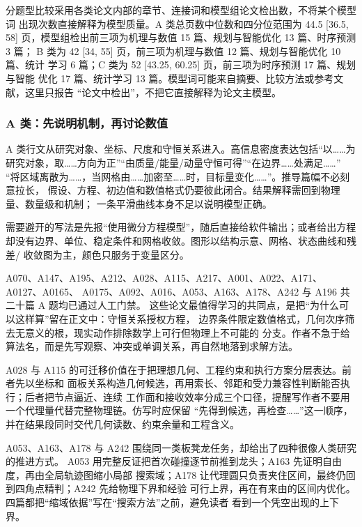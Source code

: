 \documentclass[UTF8,a4paper,12pt]{ctexart}
\begin{document}
分题型比较采用各类论文内部的章节、连接词和模型组论文检出数，不将某个模型词
出现次数直接解释为模型质量。A 类总页数中位数和四分位范围为 44.5 [36.5, 58]
页，模型组检出前三项为机理与数值 15 篇、规划与智能优化 13 篇、时序预测 3 篇；
B 类为 42 [34, 55] 页，前三项为机理与数值 12 篇、规划与智能优化 10 篇、统计
学习 6 篇；C 类为 52 [43.25, 60.25] 页，前三项为时序预测 17 篇、规划与智能
优化 17 篇、统计学习 13 篇。模型词可能来自摘要、比较方法或参考文献，这里只报告
“论文中检出”，不把它直接解释为论文主模型。

\subsubsection{A 类：先说明机制，再讨论数值}

A 类行文从研究对象、坐标、尺度和守恒关系进入。高信息密度表达包括“以……为
研究对象，取……方向为正”“由质量/能量/动量守恒可得”“在边界……处满足……”
“将区域离散为……，当网格由……加密至……时，目标量变化……”。推导篇幅不必刻意拉长，
假设、方程、初边值和数值格式仍要彼此闭合。结果解释需回到物理量、数量级和机制；
一条平滑曲线本身不足以说明模型正确。

需要避开的写法是先报“使用微分方程模型”，随后直接给软件输出；或者给出方程
却没有边界、单位、稳定条件和网格收敛。图形以结构示意、网格、状态曲线和残差/
收敛图为主，颜色只服务于变量区分。

A070、A147、A195、A212、A028、A115、A217、A001、A022、A171、A0127、A0165、
A0175、A092、A016、A053、A163、A178、A242 与 A196 共二十篇 A 题均已通过人工门禁。
这些论文最值得学习的共同点，是把“为什么可以这样算”留在正文中：守恒关系授权方程，
边界条件限定数值格式，几何次序筛去无意义的根，现实动作排除数学上可行但物理上不可能的
分支。作者不急于给算法名，而是先写观察、冲突或单调关系，再自然地落到求解方法。

A028 与 A115 的可迁移价值在于把理想几何、工程约束和执行方案分层表达。前者先以坐标和
面板关系构造几何候选，再用索长、邻距和受力兼容性判断能否执行；后者把节点逼近、连续
工作面和接收效率分成三个口径，提醒写作者不要用一个代理量代替完整物理链。仿写时应保留
“先得到候选，再检查……”这一顺序，并在结果段同时交代几何读数、约束余量和工程含义。

A053、A163、A178 与 A242 围绕同一类板凳龙任务，却给出了四种很像人类研究的推进方式。
A053 用完整反证把首次碰撞逐节前推到龙头；A163 先证明自由度，再由全局轨迹图缩小局部
搜索域；A178 让代理圆只负责夹住区间，最终仍回到四角点精判；A242 先给物理下界和经验
可行上界，再在有来由的区间内优化。四篇都把“缩域依据”写在“搜索方法”之前，避免读者
看到一个凭空出现的上下界。
\end{document}
